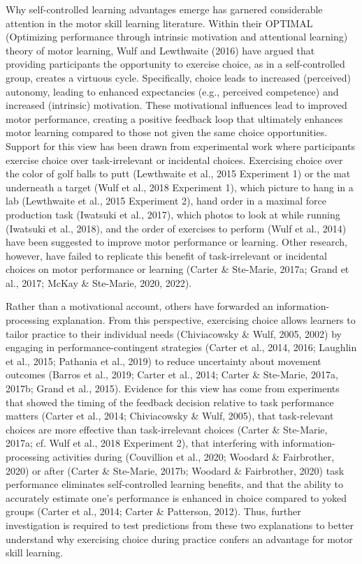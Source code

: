 \documentclass[
  man, donotrepeattitle,floatsintext]{apa7}
\begin{document}
Why self-controlled learning advantages emerge has garnered considerable attention in the motor skill learning literature. Within their OPTIMAL (Optimizing performance through intrinsic motivation and attentional learning) theory of motor learning, Wulf and Lewthwaite (2016) have argued that providing participants the opportunity to exercise choice, as in a self-controlled group, creates a virtuous cycle. Specifically, choice leads to increased (perceived) autonomy, leading to enhanced expectancies (e.g., perceived competence) and increased (intrinsic) motivation. These motivational influences lead to improved motor performance, creating a positive feedback loop that ultimately enhances motor learning compared to those not given the same choice opportunities. Support for this view has been drawn from experimental work where participants exercise choice over task-irrelevant or incidental choices. Exercising choice over the color of golf balls to putt (Lewthwaite et al., 2015 Experiment 1) or the mat underneath a target (Wulf et al., 2018 Experiment 1), which picture to hang in a lab (Lewthwaite et al., 2015 Experiment 2), hand order in a maximal force production task (Iwatsuki et al., 2017), which photos to look at while running (Iwatsuki et al., 2018), and the order of exercises to perform (Wulf et al., 2014) have been suggested to improve motor performance or learning. Other research, however, have failed to replicate this benefit of task-irrelevant or incidental choices on motor performance or learning (Carter \& Ste-Marie, 2017a; Grand et al., 2017; McKay \& Ste-Marie, 2020, 2022).

Rather than a motivational account, others have forwarded an information-processing explanation. From this perspective, exercising choice allows learners to tailor practice to their individual needs (Chiviacowsky \& Wulf, 2005, 2002) by engaging in performance-contingent strategies (Carter et al., 2014, 2016; Laughlin et al., 2015; Pathania et al., 2019) to reduce uncertainty about movement outcomes (Barros et al., 2019; Carter et al., 2014; Carter \& Ste-Marie, 2017a, 2017b; Grand et al., 2015). Evidence for this view has come from experiments that showed the timing of the feedback decision relative to task performance matters (Carter et al., 2014; Chiviacowsky \& Wulf, 2005), that task-relevant choices are more effective than task-irrelevant choices (Carter \& Ste-Marie, 2017a; cf. Wulf et al., 2018 Experiment 2), that interfering with information-processing activities during (Couvillion et al., 2020; Woodard \& Fairbrother, 2020) or after (Carter \& Ste-Marie, 2017b; Woodard \& Fairbrother, 2020) task performance eliminates self-controlled learning benefits, and that the ability to accurately estimate one's performance is enhanced in choice compared to yoked groups (Carter et al., 2014; Carter \& Patterson, 2012). Thus, further investigation is required to test predictions from these two explanations to better understand why exercising choice during practice confers an advantage for motor skill learning.
\end{document}
